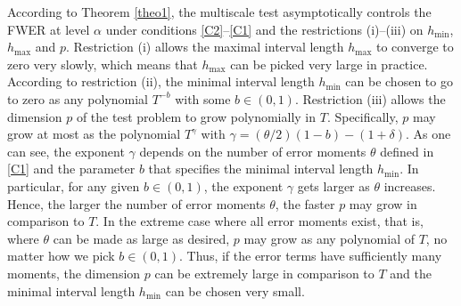 \documentclass[a4paper,12pt]{article}
\numberwithin{equation}{section}
\begin{document}
\noindent According to Theorem \ref{theo1}, the multiscale test asymptotically controls the FWER at level $\alpha$ under conditions \ref{C2}--\ref{C1} and the restrictions (i)--(iii) on $h_{\min}$, $h_{\max}$ and $p$. %
Restriction (i) allows the maximal interval length $h_{\max}$ to converge to zero very slowly, which means that $h_{\max}$ can be picked very large in practice. According to restriction (ii), the minimal interval length $h_{\min}$ can be chosen to go to zero as any polynomial $T^{-b}$ with some $b \in (0,1)$. Restriction (iii) allows the dimension $p$ of the test problem to grow polynomially in $T$. Specifically, $p$ may grow at most as the polynomial $T^{\gamma}$ with $\gamma = (\theta/2)(1-b)-(1+\delta)$. As one can see, the exponent $\gamma$ depends on the number of error moments $\theta$ defined in \ref{C1} and the parameter $b$ that specifies the minimal interval length $h_{\min}$. In particular, for any given $b \in (0,1)$, the exponent $\gamma$ gets larger as $\theta$ increases. Hence, the larger the number of error moments $\theta$, the faster $p$ may grow in comparison to $T$. In the extreme case where all error moments exist, that is, where $\theta$ can be made as large as desired, $p$ may grow as any polynomial of $T$, no matter how we pick $b \in (0,1)$. Thus, if the error terms have sufficiently many moments, the dimension $p$ can be extremely large in comparison to $T$ and the minimal interval length $h_{\min}$ can be chosen very small. 
\end{document}
